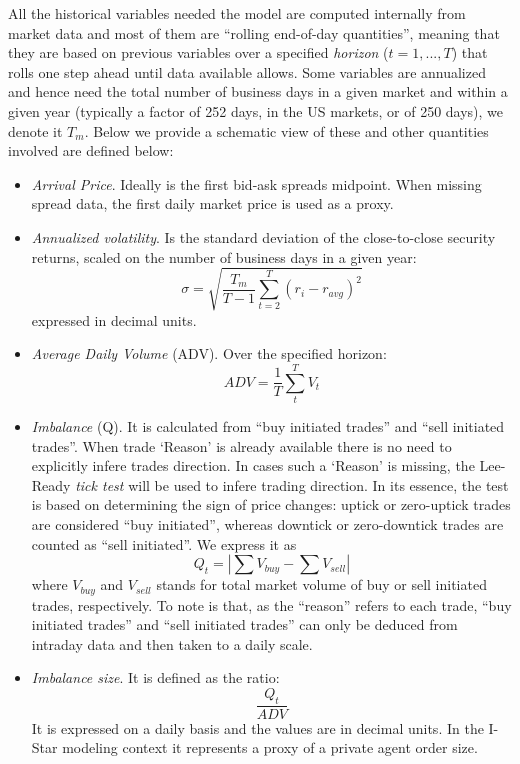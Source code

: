 All the historical variables needed the model are computed internally
from market data and most of them are ``rolling end-of-day quantities'',
meaning that they are based on previous variables over a specified
\emph{horizon} (\(t = 1,...,T\)) that rolls one step ahead until data
available allows. Some variables are annualized and hence need the total
number of business days in a given market and within a given year
(typically a factor of 252 days, in the US markets, or of 250 days), we
denote it \(T_{m}\). Below we provide a schematic view of these and
other quantities involved are defined below:

\begin{itemize}
\item
  \emph{Arrival Price}. Ideally is the first bid-ask spreads midpoint.
  When missing spread data, the first daily market price is used as a
  proxy.
\item
  \emph{Annualized volatility}. Is the standard deviation of the
  close-to-close security returns, scaled on the number of business days
  in a given year:
  \[ \sigma = \sqrt{\frac{T_{m}}{T - 1} \sum_{t = 2}^{T}{(r_{i} - r_{avg})^{2}}} \]
  expressed in decimal units.
\item
  \emph{Average Daily Volume} (ADV). Over the specified horizon:
  \[ ADV = \frac{1}{T} \sum_{t}^{T}V_{t}\]
\item
  \emph{Imbalance} (Q). It is calculated from ``buy initiated trades''
  and ``sell initiated trades''. When trade `Reason' is already
  available there is no need to explicitly infere trades direction. In
  cases such a `Reason' is missing, the Lee-Ready \emph{tick test} will
  be used to infere trading direction. In its essence, the test is based
  on determining the sign of price changes: uptick or zero-uptick trades
  are considered ``buy initiated'', whereas downtick or zero-downtick
  trades are counted as ``sell initiated''. We express it as
  \[ Q_{t} = |\sum{V_{buy}} - \sum{V_{sell}}|\] where \(V_{buy}\) and
  \(V_{sell}\) stands for total market volume of buy or sell initiated
  trades, respectively. To note is that, as the ``reason'' refers to
  each trade, ``buy initiated trades'' and ``sell initiated trades'' can
  only be deduced from intraday data and then taken to a daily scale.
\item
  \emph{Imbalance size}. It is defined as the ratio:
  \[\frac{Q_{t}}{ADV}\] It is expressed on a daily basis and the values
  are in decimal units. In the I-Star modeling context it represents a
  proxy of a private agent order size.

\end{itemize}
